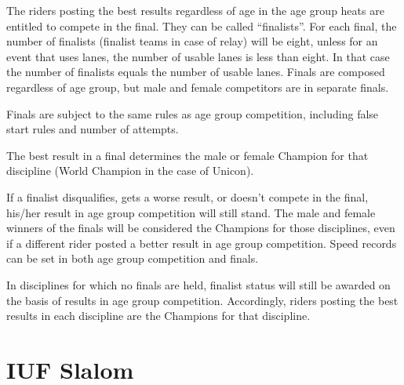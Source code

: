 The riders posting the best results regardless of age in the age group heats are entitled to compete in the final.
They can be called ``finalists''.
For each final, the number of finalists (finalist teams in case of relay) will be eight, unless for an event that uses lanes, the number of usable lanes is less than eight.
In that case the number of finalists equals the number of usable lanes.
Finals are composed regardless of age group, but male and female competitors are in separate finals.

Finals are subject to the same rules as age group competition, including false start rules and number of attempts.

The best result in a final determines the male or female Champion for that discipline (World Champion in the case of Unicon).

If a finalist disqualifies, gets a worse result, or doesn't compete in the final, his/her result in age group competition will still stand.
The male and female winners of the finals will be considered the Champions for those disciplines, even if a different rider posted a better result in age group competition.
Speed records can be set in both age group competition and finals.

In disciplines for which no finals are held, finalist status will still be awarded on the basis of results in age group competition.
Accordingly, riders posting the best results in each discipline are the Champions for that discipline.

\section{IUF Slalom}

